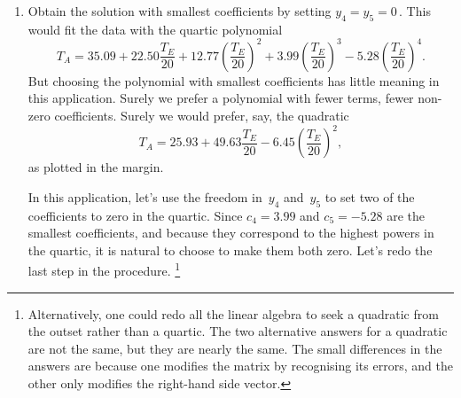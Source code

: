 \begin{example}
\begin{solution}
\begin{enumerate}
\item Obtain the solution with smallest coefficients by setting \(y_4=y_5=0\)\,.
This would fit the data with the quartic polynomial
{\small
\begin{equation*}
T_A=35.09+22.50\frac{T_E}{20} 
+12.77\left(\frac{T_E}{20}\right)^2
+3.99\left(\frac{T_E}{20}\right)^3
-5.28\left(\frac{T_E}{20}\right)^4.
\end{equation*}}%
But choosing the polynomial with smallest coefficients has little meaning in this application.
Surely we prefer a polynomial with fewer terms, fewer non-zero coefficients.
Surely we would prefer, say, the quadratic
\begin{equation*}
T_A=25.93+49.63\frac{T_E}{20} 
-6.45\left(\frac{T_E}{20}\right)^2,
\end{equation*}
as plotted in the margin.

In this application, let's use the freedom in~\(y_4\) and~\(y_5\) to set two of the coefficients to zero in the quartic.
Since \(c_4=3.99\) and \(c_5=-5.28\) are the smallest coefficients, and because they correspond to the highest powers in the quartic, it is natural to choose to make them both zero.
Let's redo the last step in the procedure.
\footnote{Alternatively, one could redo all the linear algebra to seek a quadratic from the outset rather than a quartic.  
The two alternative answers for a quadratic are not the same, but they are nearly the same.  
The small differences in the answers are because one modifies the matrix by recognising its errors, and the other only modifies the right-hand side vector.}


\end{enumerate}
\end{solution}
\end{example}
